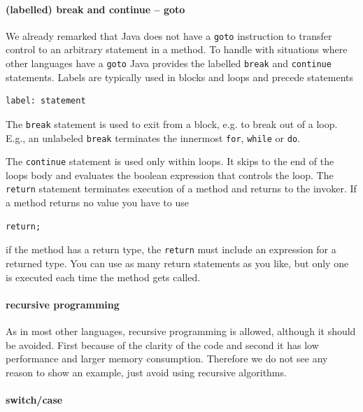\paragraph{(labelled) break and continue -- goto}
We already remarked that Java does not have a \verb|goto| instruction
to transfer control to an arbitrary statement in a method. To handle
with situations where other languages have a \verb|goto| Java provides
the labelled \verb|break| and \verb|continue| statements. Labels are
typically used in blocks and loops and precede statements
\begin{verbatim}
label: statement
\end{verbatim}
The \verb|break| statement is used to exit from a block, e.g. to break
out of a loop. E.g., an unlabeled \verb|break| terminates the innermost
\verb|for|, \verb|while| or \verb|do|.

The \verb|continue| statement is used only within loops. It skips to
the end of the loops body and evaluates the boolean expression that
controls the loop. The \verb|return| statement terminates execution of
a method and returns to the invoker. If a method returns no value you
have to use
\begin{verbatim}
return;
\end{verbatim}
if the method has a return type, the \verb|return| must include an
expression for a returned type. You can use as many return statements 
as you like, but only one is executed each time the method gets called.

\paragraph{recursive programming}
As in most other languages, recursive programming is allowed, although
it should be avoided. First because of the clarity of the code
and second it has low performance and larger memory consumption. 
Therefore we do not see any reason to show an example, just
avoid using recursive algorithms.

\paragraph{switch/case}


